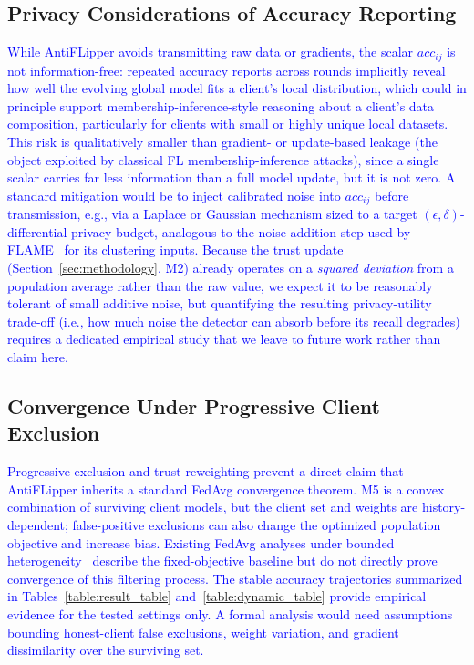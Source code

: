 \documentclass[conference]{IEEEtran}
\begin{document}
\subsection{Privacy Considerations of Accuracy Reporting}
\textcolor{blue}{While AntiFLipper avoids transmitting raw data or gradients, the scalar $acc_{ij}$ is not information-free: repeated accuracy reports across rounds implicitly reveal how well the evolving global model fits a client's local distribution, which could in principle support membership-inference-style reasoning about a client's data composition, particularly for clients with small or highly unique local datasets. This risk is qualitatively smaller than gradient- or update-based leakage (the object exploited by classical FL membership-inference attacks), since a single scalar carries far less information than a full model update, but it is not zero. A standard mitigation would be to inject calibrated noise into $acc_{ij}$ before transmission, e.g., via a Laplace or Gaussian mechanism sized to a target $(\epsilon,\delta)$-differential-privacy budget, analogous to the noise-addition step used by FLAME~\cite{nguyen2022flame} for its clustering inputs. Because the trust update (Section~\ref{sec:methodology}, M2) already operates on a \emph{squared deviation} from a population average rather than the raw value, we expect it to be reasonably tolerant of small additive noise, but quantifying the resulting privacy-utility trade-off (i.e., how much noise the detector can absorb before its recall degrades) requires a dedicated empirical study that we leave to future work rather than claim here.}

\subsection{Convergence Under Progressive Client Exclusion}
\textcolor{blue}{Progressive exclusion and trust reweighting prevent a direct claim that AntiFLipper inherits a standard FedAvg convergence theorem. M5 is a convex combination of surviving client models, but the client set and weights are history-dependent; false-positive exclusions can also change the optimized population objective and increase bias. Existing FedAvg analyses under bounded heterogeneity~\cite{li2020convergence} describe the fixed-objective baseline but do not directly prove convergence of this filtering process. The stable accuracy trajectories summarized in Tables~\ref{table:result_table} and~\ref{table:dynamic_table} provide empirical evidence for the tested settings only. A formal analysis would need assumptions bounding honest-client false exclusions, weight variation, and gradient dissimilarity over the surviving set.}
\end{document}
